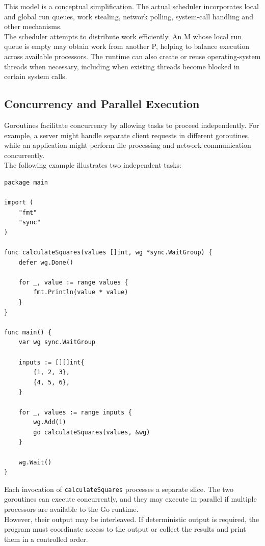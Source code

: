This model is a conceptual simplification. The actual scheduler incorporates local and global run queues, work stealing, network polling, system-call handling and other mechanisms.\\

The scheduler attempts to distribute work efficiently. An M whose local run queue is empty may obtain work from another P, helping to balance execution across available processors. The runtime can also create or reuse operating-system threads when necessary, including when existing threads become blocked in certain system calls.

\subsection{Concurrency and Parallel Execution}

Goroutines facilitate concurrency by allowing tasks to proceed independently. For example, a server might handle separate client requests in different goroutines, while an application might perform file processing and network communication concurrently.\\

The following example illustrates two independent tasks:

\begin{lstlisting}
package main

import (
    "fmt"
    "sync"
)

func calculateSquares(values []int, wg *sync.WaitGroup) {
    defer wg.Done()

    for _, value := range values {
        fmt.Println(value * value)
    }
}

func main() {
    var wg sync.WaitGroup

    inputs := [][]int{
        {1, 2, 3},
        {4, 5, 6},
    }

    for _, values := range inputs {
        wg.Add(1)
        go calculateSquares(values, &wg)
    }

    wg.Wait()
}
\end{lstlisting}

Each invocation of \texttt{calculateSquares} processes a separate slice. The two goroutines can execute concurrently, and they may execute in parallel if multiple processors are available to the Go runtime.\\

However, their output may be interleaved. If deterministic output is required, the program must coordinate access to the output or collect the results and print them in a controlled order.\\

